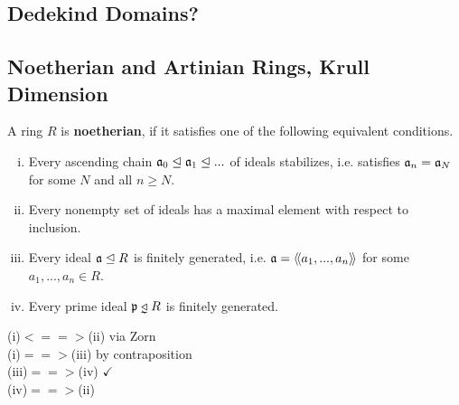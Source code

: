	\subsection{Dedekind Domains?}

	\newpage
	\subsection{Noetherian and Artinian Rings, Krull Dimension}

	\begin{definition}
		A ring $R$ is \textbf{noetherian}, if it satisfies one of the following equivalent conditions.
		\begin{enumerate}[(i)]
			\item{
				Every ascending chain $\mathfrak{a}_0 \trianglelefteq \mathfrak{a}_1 \trianglelefteq ...$ of ideals stabilizes, i.e. satisfies $\mathfrak{a}_n = \mathfrak{a}_N$ for some $N$ and all $n \geq N$.
			}
			\item{
				Every nonempty set of ideals has a maximal element with respect to inclusion.
			}
			\item{
				Every ideal $\mathfrak{a} \trianglelefteq R$ is finitely generated, i.e. $\mathfrak{a} = \langle\!\langle a_1,...,a_n \rangle\!\rangle$ for some $a_1,...,a_n \in R$.
			}
			\item{
				Every prime ideal $\ideal{p} \divneq R$ is finitely generated.
			}
		\end{enumerate}
	\end{definition}
	\begin{sketch}
		(i)$<==>$(ii) via Zorn\\
		(i)$==>$(iii) by contraposition\\
		(iii)$==>$(iv) $\checkmark$\\
		(iv)$==>$(ii)
	\end{sketch}

